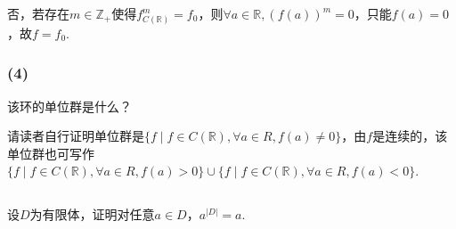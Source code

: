 \jie 否，若存在$m\in\mathbb{Z}_+$使得$f^m_{C(\mathbb{R})}=f_0$，则$\forall a\in\mathbb{R}, (f(a))^m=0$，只能$f(a)=0$，故$f=f_0$.

\subsubsection{(4)}
该环的单位群是什么？

\jie 请读者自行证明单位群是$\{f\mid f\in C(\mathbb{R}), \forall a\in R,f(a)\neq 0\}$，由$f$是连续的，该单位群也可写作$\{f\mid f\in C(\mathbb{R}), \forall a\in R,f(a)> 0\}\cup\{f\mid f\in C(\mathbb{R}), \forall a\in R,f(a)< 0\}$.

\subsection{}
设$D$为有限体，证明对任意$a\in D$，$a^{|D|}=a$.

